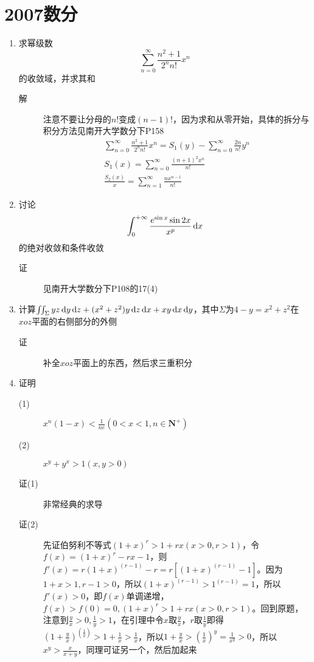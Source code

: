 \section{2007数分}
\begin{enumerate}
\item 求幂级数
\[
\sum_{n=0}^{\infty}\frac{n^2+1}{2^nn!}x^n
\]
的收敛域，并求其和
\begin{description}
\item[解] 注意不要让分母的$n!$变成$(n-1)!$，因为求和从零开始，具体的拆分与积分方法见南开大学数分下P158
\begin{eqnarray*}
\sum_{n=0}^{\infty}\frac{n^2+1}{2^nn!}x^n=S_1(y)-\sum_{n=0}^{\infty}\frac{2n}{n!}y^n\\
S_1(x)=\sum_{n=0}^{\infty} \frac{(n+1)^2x^n}{n!}\\
\frac{S_2(x)}{x}=\sum_{n=1}^{\infty} \frac{nx^{n-1}}{n!}
\end{eqnarray*}
\end{description}

\item 讨论
\[
\int_0^{+\infty}\frac{e^{\sin x}\sin2x}{x^p}\,\mathrm{d} x
\]
的绝对收敛和条件收敛
\begin{description}
\item[证] 见南开大学数分下P108的17(4)
\end{description}

\item 计算$\iint_{\Sigma}yz\,\mathrm{d} y \,\mathrm{d} z+(x^2+z^2)y\,\mathrm{d} z \,\mathrm{d} x+xy\,\mathrm{d} x \,\mathrm{d} y$，其中$\Sigma$为$4-y=x^2+z^2$在$xoz$平面的右侧部分的外侧
\begin{description}
\item[证] 补全$xoz$平面上的东西，然后求三重积分
\end{description}

\item 证明
\begin{description}
\item[(1)] $x^n(1-x)<\frac{1}{ne}(0<x<1,n\in\mathbf{N^+})$
\item[(2)] $x^y+y^x>1(x,y>0)$
\item[证(1)] 非常经典的求导
\item[证(2)] 先证伯努利不等式$(1+x)^r>1+rx(x>0,r>1)$，令$f(x)=(1+x)^r-rx-1$，则$f'(x)=r(1+x)^{(r-1)}-r=r[(1+x)^{(r-1)}-1]$。因为$1+x>1,r-1>0$，所以$(1+x)^{(r-1)}>1^{(r-1)}=1$，所以$f'(x)>0$，即$f(x)$单调递增，$f(x)>f(0)=0,(1+x)^r>1+rx(x>0,r>1)$。回到原题，注意到$\frac{y}{x}>0,\frac{1}{y}>1$，在引理中令$x$取$\frac{y}{x}$，$r$取$\frac{1}{y}$即得$(1+\frac{y}{x})^{(\frac{1}{y})}>1+\frac{1}{x}>\frac{1}{x}$，所以$1+\frac{y}{x}>(\frac{1}{x})^y=\frac{1}{x^y}>0$，所以$x^y>\frac{x}{x+y}$，同理可证另一个，然后加起来


\end{description}
\end{enumerate}
